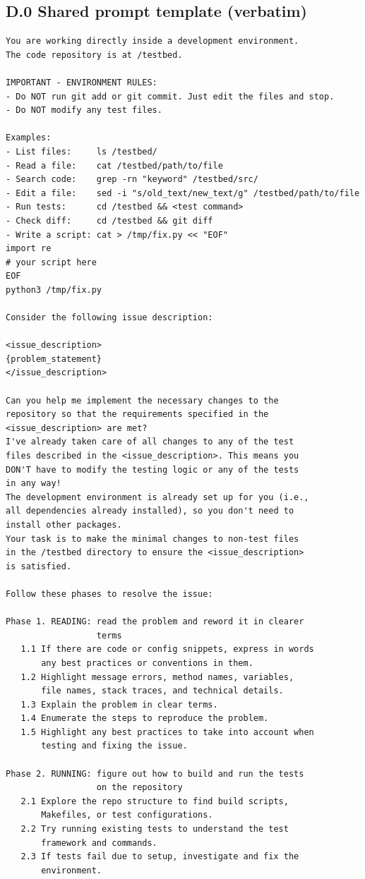 \documentclass{llmxive}
\begin{document}
\subsection*{D.0 Shared prompt template (verbatim)}

\begin{verbatim}
You are working directly inside a development environment.
The code repository is at /testbed.

IMPORTANT - ENVIRONMENT RULES:
- Do NOT run git add or git commit. Just edit the files and stop.
- Do NOT modify any test files.

Examples:
- List files:     ls /testbed/
- Read a file:    cat /testbed/path/to/file
- Search code:    grep -rn "keyword" /testbed/src/
- Edit a file:    sed -i "s/old_text/new_text/g" /testbed/path/to/file
- Run tests:      cd /testbed && <test command>
- Check diff:     cd /testbed && git diff
- Write a script: cat > /tmp/fix.py << "EOF"
import re
# your script here
EOF
python3 /tmp/fix.py

Consider the following issue description:

<issue_description>
{problem_statement}
</issue_description>

Can you help me implement the necessary changes to the
repository so that the requirements specified in the
<issue_description> are met?
I've already taken care of all changes to any of the test
files described in the <issue_description>. This means you
DON'T have to modify the testing logic or any of the tests
in any way!
The development environment is already set up for you (i.e.,
all dependencies already installed), so you don't need to
install other packages.
Your task is to make the minimal changes to non-test files
in the /testbed directory to ensure the <issue_description>
is satisfied.

Follow these phases to resolve the issue:

Phase 1. READING: read the problem and reword it in clearer
                  terms
   1.1 If there are code or config snippets, express in words
       any best practices or conventions in them.
   1.2 Highlight message errors, method names, variables,
       file names, stack traces, and technical details.
   1.3 Explain the problem in clear terms.
   1.4 Enumerate the steps to reproduce the problem.
   1.5 Highlight any best practices to take into account when
       testing and fixing the issue.

Phase 2. RUNNING: figure out how to build and run the tests
                  on the repository
   2.1 Explore the repo structure to find build scripts,
       Makefiles, or test configurations.
   2.2 Try running existing tests to understand the test
       framework and commands.
   2.3 If tests fail due to setup, investigate and fix the
       environment.


\end{verbatim}
\end{document}

